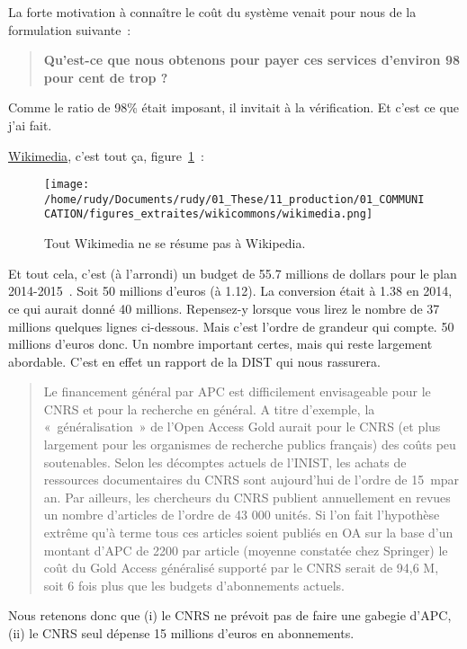 La forte motivation à connaître le coût du système venait pour nous de la formulation suivante~:
\blockcquote{moody_open_2016}{\textbf{Qu'est-ce que nous obtenons pour payer ces services d'environ 98 pour cent de trop ?}
}
Comme le ratio de 98\% était imposant, il invitait à la vérification.
Et c'est ce que j'ai fait.

\href{https://wikimediafoundation.org/wiki/Home}{Wikimedia}, c'est tout ça, figure~\ref{fig:Wikimedia}~:
\begin{figure}[htbp]
\begin{center}
\texttt{[image: /home/rudy/Documents/rudy/01\_These/11\_production/01\_COMMUNICATION/figures\_extraites/wikicommons/wikimedia.png]}
\caption{Tout Wikimedia ne se résume pas à Wikipedia.}
\label{fig:Wikimedia}
\end{center}
\end{figure}
Et tout cela, c'est (à l'arrondi) un budget de 55.7 millions de dollars pour le plan 2014-2015~\cite{_wikimedia_????}.
Soit 50 millions d'euros (à 1.12).
La conversion était à 1.38 en 2014, ce qui aurait donné 40 millions.
Repensez-y lorsque vous lirez le nombre de 37 millions quelques lignes ci-dessous.
Mais c'est l'ordre de grandeur qui compte.
50 millions d'euros donc.
Un nombre important certes, mais qui reste largement abordable.
C'est en effet un rapport de la \gls{DIST} qui nous rassurera.

\blockcquote{direction_de_linformation_scientifique_et_technique_publication_????}{
Le financement général par APC est difficilement envisageable pour le CNRS et pour la recherche en général.
A titre d’exemple, la «~généralisation~» de l’Open Access Gold aurait pour le CNRS (et plus largement pour les organismes de recherche publics français) des coûts peu soutenables.
Selon les décomptes actuels de l’INIST, les achats de ressources documentaires du CNRS sont aujourd’hui de l’ordre de 15~m\officialeuro par an.
Par ailleurs, les chercheurs du CNRS publient annuellement en revues un nombre d’articles de l’ordre de 43 000 unités.
Si l’on fait l’hypothèse extrême qu’à terme tous ces articles soient publiés en OA sur la base d’un montant d’APC de 2200 \officialeuro par article (moyenne constatée chez Springer) le coût du Gold Access généralisé supporté par le CNRS serait de 94,6 M\officialeuro, soit 6 fois plus que les budgets d’abonnements actuels.
}
Nous retenons donc que (i) le CNRS ne prévoit pas de faire une gabegie d'APC, (ii) le CNRS seul dépense 15 millions d'euros en abonnements.

